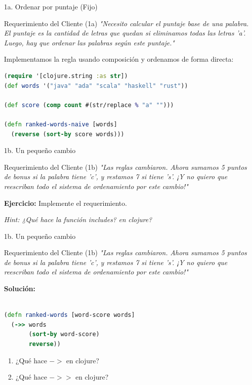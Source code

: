 \documentclass{beamer}
\begin{document}
\begin{frame}[fragile]{1a. Ordenar por puntaje (Fijo)}
    \begin{exampleblock}{Requerimiento del Cliente (1a)}
        \textit{"Necesito calcular el puntaje base de una palabra. El puntaje es la cantidad de letras que quedan si eliminamos todas las letras 'a'. Luego, hay que ordenar las palabras según este puntaje."}
    \end{exampleblock}

    Implementamos la regla usando composición y ordenamos de forma directa:

    \begin{lstlisting}[language=Clojure]
(require '[clojure.string :as str])
(def words '("java" "ada" "scala" "haskell" "rust"))

(def score (comp count #(str/replace % "a" "")))

(defn ranked-words-naive [words]
  (reverse (sort-by score words)))
    \end{lstlisting}
\end{frame}

\begin{frame}[fragile]{1b. Un pequeño cambio}
    \begin{exampleblock}{Requerimiento del Cliente (1b)}
        \textit{"Las reglas cambiaron. Ahora sumamos 5 puntos de bonus si la palabra tiene 'c', y restamos 7 si tiene 's'. ¡Y no quiero que reescriban todo el sistema de ordenamiento por este cambio!"}
    \end{exampleblock}

    \textbf{Ejercicio:} Implemente el requerimiento.

    \textit{Hint: ¿Qué hace la función includes? en clojure?} \\
\end{frame}

\begin{frame}[fragile]{1b. Un pequeño cambio}
    \begin{exampleblock}{Requerimiento del Cliente (1b)}
        \textit{"Las reglas cambiaron. Ahora sumamos 5 puntos de bonus si la palabra tiene 'c', y restamos 7 si tiene 's'. ¡Y no quiero que reescriban todo el sistema de ordenamiento por este cambio!"}
    \end{exampleblock}

    \textbf{Solución:}

    \begin{lstlisting}[language=Clojure]

(defn ranked-words [word-score words]
  (->> words
       (sort-by word-score)
       reverse))
    \end{lstlisting}

    \begin{enumerate}
        \item ¿Qué hace $->$ en clojure?
        \item ¿Qué hace $->>$ en clojure?
    \end{enumerate}
\end{frame}
\end{document}
